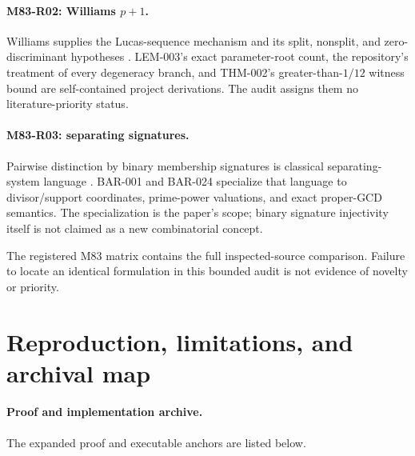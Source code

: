 \documentclass[11pt]{article}
\begin{document}
\paragraph{M83-R02: Williams \(p+1\).}
Williams supplies the Lucas-sequence mechanism and its split, nonsplit, and
zero-discriminant hypotheses \cite{williams1982pplusone}. LEM-003's exact
parameter-root count, the repository's treatment of every degeneracy branch,
and THM-002's greater-than-\(1/12\) witness bound are self-contained project
derivations. The audit assigns them no literature-priority status.

\paragraph{M83-R03: separating signatures.}
Pairwise distinction by binary membership signatures is classical
separating-system language \cite{katona1966separating}. BAR-001 and BAR-024
specialize that language to divisor/support coordinates, prime-power
valuations, and exact proper-GCD semantics. The specialization is the
paper's scope; binary signature injectivity itself is not claimed as a new
combinatorial concept.

The registered M83 matrix contains the full inspected-source comparison.
Failure to locate an identical formulation in this bounded audit is not
evidence of novelty or priority.

\section{Reproduction, limitations, and archival map}
\label{app:promise-reproduction}

\paragraph{Proof and implementation archive.}
The expanded proof and executable anchors are listed below.
\par\smallskip
\noindent\begin{minipage}{\linewidth}
\raggedright\small
{}\\
\\
\\
\end{minipage}
\end{document}
